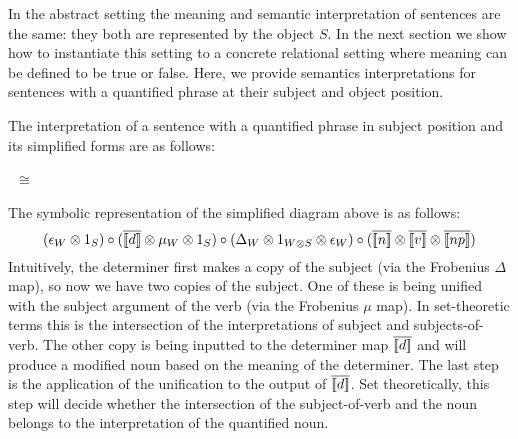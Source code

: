 %
%




In the  abstract setting the meaning and semantic interpretation of sentences are the same: they both are represented by the object $S$.  In the next section we show how to instantiate this setting to a concrete relational setting where meaning can be defined to be true or false.  Here, we provide semantics  interpretations for sentences with a quantified phrase at their subject and object position.  

The interpretation of a  sentence with a  quantified phrase in  subject position  and its simplified forms are as follows:


\begin{minipage}{20cm}
\begin{minipage}{7cm}
\end{minipage}
\ $\cong$ \ \qquad
\begin{minipage}{5cm}
\end{minipage}
\end{minipage}


\noindent
The symbolic representation of the simplified   diagram above is as follows:
\[
(\epsilon_W \otimes 1_S) \circ (\overline{\semantics{d}} \otimes  \mu_W \otimes 1_S) \circ (\Delta_W \otimes 1_{W \otimes S} \otimes \epsilon_W)  \circ (\overline{\semantics{n}} \otimes \overline{\semantics{v}} \otimes \overline{\semantics{np}})
\]
Intuitively,   the determiner first makes a copy of the subject (via the Frobenius $\Delta$ map), so now we have two copies of the subject. One of these is being unified with the subject argument of the verb (via the Frobenius $\mu$ map). In set-theoretic terms this is the intersection of the interpretations of subject and subjects-of-verb. The other copy is being inputted to the determiner map $\overline{[\![ d ]\!]}$ and will produce a modified noun based on the meaning of the determiner.  The last step is the application of the unification to the output of $\overline{[\![ d ]\!]}$. Set theoretically, this step will decide whether the intersection of the subject-of-verb and the noun belongs to the interpretation of the quantified noun. 


